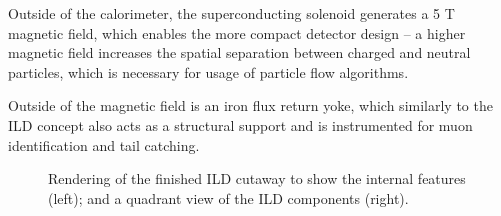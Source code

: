 Outside of the calorimeter, the superconducting solenoid generates a 5 T magnetic field, which enables the more compact detector design -- a higher magnetic field increases the spatial separation between charged and neutral particles, which is necessary for usage of particle flow algorithms.

Outside of the magnetic field is an iron flux return yoke, which similarly to the \acrshort{ILD} concept also acts as a structural support and is instrumented for muon identification and tail catching. 

\begin{figure}[p]%
	\centering
    \qquad
    \caption{Rendering of the finished \acrshort{ILD} cutaway to show the internal features (left); and a quadrant view of the \acrshort{ILD} components (right).}%
    \label{figure:colliders/ILD/double}%
\end{figure}

